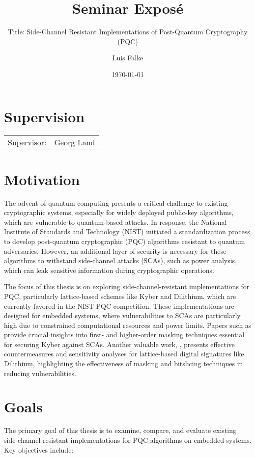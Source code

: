 \documentclass{scrartcl}
\title{Seminar Exposé}
\subtitle{Title: Side-Channel Resistant Implementations of Post-Quantum Cryptography (PQC)}
\author{Luis Falke}
\date{\today}
\begin{document}
\maketitle

\section*{Supervision}
\begin{tabular}{ll}
	Supervisor: & Georg Land \\
\end{tabular}

\section*{Motivation}
The advent of quantum computing presents a critical challenge to existing cryptographic systems, especially for widely deployed public-key algorithms, which are vulnerable to quantum-based attacks. In response, the National Institute of Standards and Technology (NIST) initiated a standardization process to develop post-quantum cryptographic (PQC) algorithms resistant to quantum adversaries. However, an additional layer of security is necessary for these algorithms to withstand side-channel attacks (SCAs), such as power analysis, which can leak sensitive information during cryptographic operations.

The focus of this thesis is on exploring side-channel-resistant implementations for PQC, particularly lattice-based schemes like Kyber and Dilithium, which are currently favored in the NIST PQC competition. These implementations are designed for embedded systems, where vulnerabilities to SCAs are particularly high due to constrained computational resources and power limits. Papers such as \cite{Bos21} provide crucial insights into first- and higher-order masking techniques essential for securing Kyber against SCAs. Another valuable work, \cite{Azouaoui22}, presents effective countermeasures and sensitivity analyses for lattice-based digital signatures like Dilithium, highlighting the effectiveness of masking and bitslicing techniques in reducing vulnerabilities.

\section*{Goals}
The primary goal of this thesis is to examine, compare, and evaluate existing side-channel-resistant implementations for PQC algorithms on embedded systems. Key objectives include:
\end{document}
